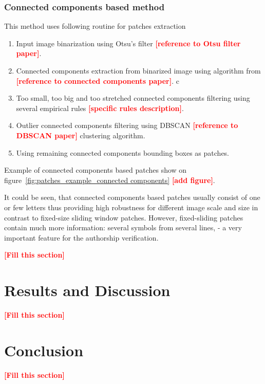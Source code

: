 \documentclass[conference,a4paper,twocolumn]{IEEEtran}
\newcommand{\todo}[1]{\textcolor{red}{\textbf{[#1]}}} %
\begin{document}
\subsubsection{Connected components based method}
This method uses following routine for patches extraction

\begin{enumerate}
	\item Input image binarization using Otsu's filter \todo{reference to Otsu filter paper}.
	\item Connected components extraction from binarized image using algorithm from \todo{reference to connected components paper}.
c	\item Too small, too big and too stretched connected components filtering using several empirical rules \todo{specific rules description}.
	\item Outlier connected components filtering using DBSCAN \todo{reference to DBSCAN paper} clustering algorithm.
	\item Using remaining connected components bounding boxes as patches.
\end{enumerate}

Example of connected components based patches show on figure~\ref{fig:patches_example_connected components} \todo{add figure}. 

It could be seen, that connected components based patches usually consist of one or few letters thus providing high robustness for different image scale and size in contrast to fixed-size sliding window patches. However, fixed-sliding patches contain much more information: several symbols from several lines, - a very important feature for the authorship verification.



\todo{Fill this section}


\section{Results and Discussion}


\todo{Fill this section}

\section{Conclusion}


\todo{Fill this section}

\end{document}
